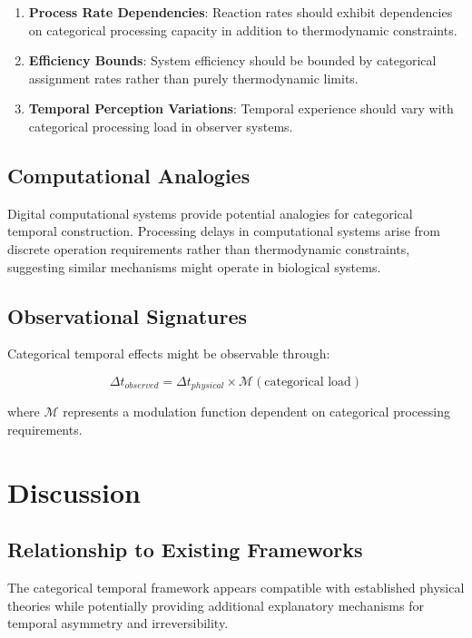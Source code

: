 \documentclass[12pt,a4paper]{article}
\theoremstyle{remark}
\begin{document}
\begin{enumerate}
\item \textbf{Process Rate Dependencies}: Reaction rates should exhibit dependencies on categorical processing capacity in addition to thermodynamic constraints.

\item \textbf{Efficiency Bounds}: System efficiency should be bounded by categorical assignment rates rather than purely thermodynamic limits.

\item \textbf{Temporal Perception Variations}: Temporal experience should vary with categorical processing load in observer systems.
\end{enumerate}

\subsection{Computational Analogies}

Digital computational systems provide potential analogies for categorical temporal construction. Processing delays in computational systems arise from discrete operation requirements rather than thermodynamic constraints, suggesting similar mechanisms might operate in biological systems.

\subsection{Observational Signatures}

Categorical temporal effects might be observable through:

\begin{equation}
\Delta t_{observed} = \Delta t_{physical} \times \mathcal{M}(\text{categorical load})
\end{equation}

where $\mathcal{M}$ represents a modulation function dependent on categorical processing requirements.

\section{Discussion}

\subsection{Relationship to Existing Frameworks}

The categorical temporal framework appears compatible with established physical theories while potentially providing additional explanatory mechanisms for temporal asymmetry and irreversibility.
\end{document}
